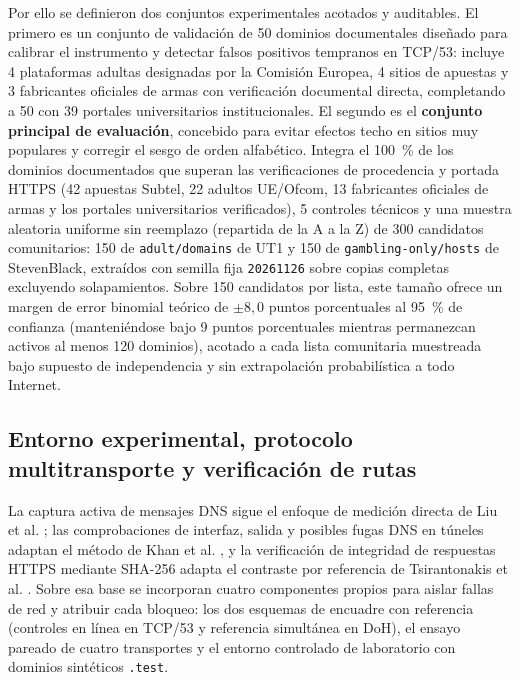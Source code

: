 \documentclass[10pt,a4paper]{article}
\begin{document}
Por ello se definieron dos conjuntos experimentales acotados y auditables. El primero es un conjunto de validación de 50 dominios documentales diseñado para calibrar el instrumento y detectar falsos positivos tempranos en TCP/53: incluye 4 plataformas adultas designadas por la Comisión Europea, 4 sitios de apuestas y 3 fabricantes oficiales de armas con verificación documental directa, completando a 50 con 39 portales universitarios institucionales. El segundo es el \textbf{conjunto principal de evaluación}, concebido para evitar efectos techo en sitios muy populares y corregir el sesgo de orden alfabético. Integra el 100~\% de los dominios documentados que superan las verificaciones de procedencia y portada HTTPS (42 apuestas Subtel, 22 adultos UE/Ofcom, 13 fabricantes oficiales de armas y los portales universitarios verificados), 5 controles técnicos y una muestra aleatoria uniforme sin reemplazo (repartida de la A a la Z) de 300 candidatos comunitarios: 150 de \texttt{adult/domains} de UT1 y 150 de \texttt{gambling-only/hosts} de StevenBlack, extraídos con semilla fija \texttt{20261126} sobre copias completas excluyendo solapamientos. Sobre 150 candidatos por lista, este tamaño ofrece un margen de error binomial teórico de $\pm 8{,}0$ puntos porcentuales al 95~\% de confianza (manteniéndose bajo 9 puntos porcentuales mientras permanezcan activos al menos 120 dominios), acotado a cada lista comunitaria muestreada bajo supuesto de independencia y sin extrapolación probabilística a todo Internet.

\subsection{Entorno experimental, protocolo multitransporte y verificación de rutas}\label{subsec:metodo-entorno}

La captura activa de mensajes DNS sigue el enfoque de medición directa de Liu et al. \cite{liu2024}; las comprobaciones de interfaz, salida y posibles fugas DNS en túneles adaptan el método de Khan et al. \cite{khan2018vpn}, y la verificación de integridad de respuestas HTTPS mediante SHA-256 adapta el contraste por referencia de Tsirantonakis et al. \cite{tsirantonakis2018proxy}. Sobre esa base se incorporan cuatro componentes propios para aislar fallas de red y atribuir cada bloqueo: los dos esquemas de encuadre con referencia (controles en línea en TCP/53 y referencia simultánea en DoH), el ensayo pareado de cuatro transportes y el entorno controlado de laboratorio con dominios sintéticos \texttt{.test}.
\end{document}
